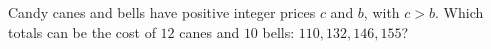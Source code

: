 Candy canes and bells have positive integer prices $c$ and $b$, with $c>b$. Which totals can be the cost of $12$ canes and $10$ bells: $110,132,146,155$?
